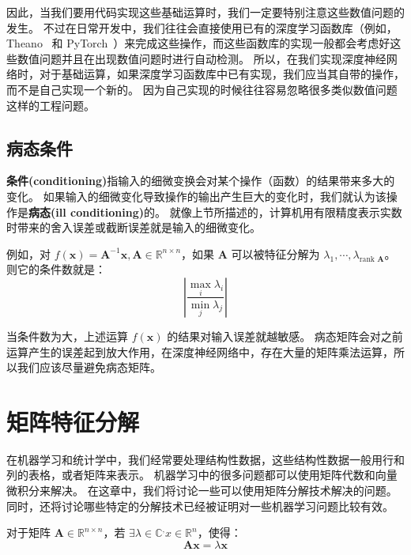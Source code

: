 因此，当我们要用代码实现这些基础运算时，我们一定要特别注意这些数值问题的发生。
不过在日常开发中，我们往往会直接使用已有的深度学习函数库（例如，Theano~\cite{theano} 和 PyTorch~\cite{pytorch}）来完成这些操作，而这些函数库的实现一般都会考虑好这些数值问题并且在出现数值问题时进行自动检测。
所以，在我们实现深度神经网络时，对于基础运算，如果深度学习函数库中已有实现，我们应当其自带的操作，而不是自己实现一个新的。
因为自己实现的时候往往容易忽略很多类似数值问题这样的工程问题。

\section{病态条件}
\textbf{条件(conditioning)}指输入的细微变换会对某个操作（函数）的结果带来多大的变化。
如果输入的细微变化导致操作的输出产生巨大的变化时，我们就认为该操作是\textbf{病态(ill conditioning)}的。
就像上节所描述的，计算机用有限精度表示实数时带来的舍入误差或截断误差就是输入的细微变化。

例如，对 $f(\bm{x}) = \bm{A}^{-1} \bm{x}, \bm{A} \in \mathbb{R}^{n \times n}$，如果 $\bm{A}$ 可以被特征分解为 $\lambda_1, \cdots, \lambda_{\text{rank } \bm{A}}$。
则它的条件数就是：
\begin{equation}
	\left|\frac{\max_{i} \lambda_i}{\min_j \lambda_j}\right|
\end{equation}

当条件数为大，上述运算 $f(\bm{x})$ 的结果对输入误差就越敏感。
病态矩阵会对之前运算产生的误差起到放大作用，在深度神经网络中，存在大量的矩阵乘法运算，所以我们应该尽量避免病态矩阵。


\chapter{矩阵特征分解}
\label{chap:matrix_decom}
在机器学习和统计学中，我们经常要处理结构性数据，这些结构性数据一般用行和列的表格，或者矩阵来表示。
机器学习中的很多问题都可以使用矩阵代数和向量微积分来解决。
在这章中，我们将讨论一些可以使用矩阵分解技术解决的问题。
同时，还将讨论哪些特定的分解技术已经被证明对一些机器学习问题比较有效。

对于矩阵 $\bm{A} \in \mathbb{R}^{n \times n}$，若 $\exists \lambda \in \mathbb{C}^, x \in \mathbb{R}^n$，使得：
\begin{equation}
	\bm{Ax} = \lambda \bm{x}
\end{equation}

